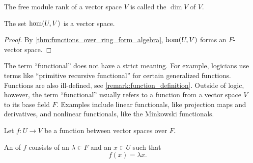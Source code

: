 \begin{definition}\label{def:vector_space_dimension}
  The free module rank of a vector space \( V \) is called the  \( \dim V \) of \( V \).
\end{definition}

\begin{proposition}\label{thm:linear_maps_form_algebra}
  The set \( \operatorname{hom}(U, V) \) is a vector space.
\end{proposition}
\begin{proof}
  By \cref{thm:functions_over_ring_form_algebra}, \( \operatorname{hom}(U, V) \) forms an \( F \)-vector space.
\end{proof}

\begin{remark}\label{remark:functional}
  The term \enquote{functional} does not have a strict meaning. For example, logicians use terms like \enquote{primitive recursive functional} for certain generalized functions. Functions are also ill-defined, see \cref{remark:function_definition}. Outside of logic, however, the term \enquote{functional} usually refers to a function from a vector space \( V \) to its base field \( F \). Examples include linear functionals, like projection maps and derivatives, and nonlinear functionals, like the Minkowski functionals.
\end{remark}

\begin{definition}\label{def:eigenpair}
  Let \( f: U \to V \) be a function between vector spaces over \( F \).

  An  of \( f \) consists of an  \( \lambda \in F \) and an  \( x \in U \) such that
  \begin{equation*}
    f(x) = \lambda x.
  \end{equation*}
\end{definition}
